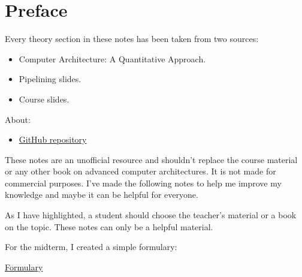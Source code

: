 \section*{Preface}

Every theory section in these notes has been taken from two sources:
\begin{itemize}
    \item Computer Architecture: A Quantitative Approach.\cite{hennessy2017computer}
    \item Pipelining slides.\cite{pipelining-slides}
    \item Course slides.\cite{course-slides-polimi}
\end{itemize}
About:
\begin{itemize}
    \item[\faIcon{github}] \href{https://github.com/PoliMI-HPC-E-notes-projects-AndreVale69/HPC-E-PoliMI-university-notes}{GitHub repository}
    \begin{center}
    \end{center}
\end{itemize}
These notes are an unofficial resource and shouldn't replace the course material or any other book on advanced computer architectures. It is not made for commercial purposes. I've made the following notes to help me improve my knowledge and maybe it can be helpful for everyone.

As I have highlighted, a student should choose the teacher's material or a book on the topic. These notes can only be a helpful material.

\highspace
For the midterm, I created a simple formulary:
\begin{center}
    \href{https://github.com/PoliMI-HPC-E-notes-projects-AndreVale69/HPC-E-PoliMI-university-notes/blob/main/advanced-computer-architectures/notes/formulary.pdf}{Formulary}
\end{center}